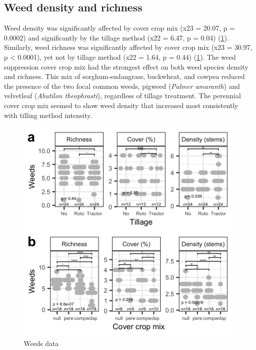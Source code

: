 \documentclass[
]{article}
\begin{document}
\hypertarget{weed-density-and-richness}{%
\subsection{Weed density and richness}\label{weed-density-and-richness}}

Weed density was significantly affected by cover crop mix (x23 = 20.07, p = 0.0002) and significantly by the tillage method (x22 = 6.47, p = 0.04) (\ref{fig:weedsFig}).
Similarly, weed richness was significantly affected by cover crop mix (x23 = 30.97, p \textless{} 0.0001), yet not by tillage method (x22 = 1.64, p = 0.44) (\ref{fig:weedsFig}).
The weed suppression cover crop mix had the strongest effect on both weed species density and richness.
This mix of sorghum-sudangrass, buckwheat, and cowpea reduced the presence of the two focal common weeds, pigweed (\emph{Palmer amaranth}) and velvetleaf (\emph{Abutilon theophrasti}), regardless of tillage treatment.
The perennial cover crop mix seemed to show weed density that increased most consistently with tilling method intensity.

\begin{figure}
\includegraphics[width=12.5in]{../figs/weedPlot} \caption{Weeds data}\label{fig:weedsFig}
\end{figure}
\end{document}
